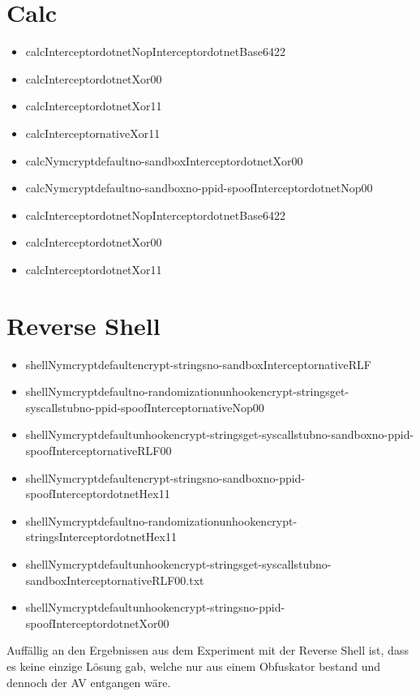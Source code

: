 \section{Calc}
\begin{itemize}
\item calcInterceptordotnetNopInterceptordotnetBase6422
\item calcInterceptordotnetXor00
\item calcInterceptordotnetXor11
\item calcInterceptornativeXor11
\item calcNymcryptdefaultno-sandboxInterceptordotnetXor00
\item calcNymcryptdefaultno-sandboxno-ppid-spoofInterceptordotnetNop00
\item calcInterceptordotnetNopInterceptordotnetBase6422
\item calcInterceptordotnetXor00
\item calcInterceptordotnetXor11
\end{itemize}
    
\section{Reverse Shell}
\begin{itemize}
\item shellNymcryptdefaultencrypt-stringsno-sandboxInterceptornativeRLF
\item shellNymcryptdefaultno-randomization\-unhookencrypt-stringsget-syscallstubno-ppid-spoof\-InterceptornativeNop00
\item shellNymcryptdefault\-unhookencrypt-stringsget-syscallstubno-sandboxno-ppid-spoof\-InterceptornativeRLF00
\item shellNymcryptdefault\-encrypt-stringsno-sandboxno-ppid-spoof\-InterceptordotnetHex11
\item shellNymcryptdefaultno-randomization\-unhooken\-crypt-stringsInterceptordotnetHex11
\item shellNymcryptdefault\-unhook\-encrypt-stringsget\--syscallstubno-sandbox\-InterceptornativeRLF00.txt
\item shellNymcryptdefaultunhookencrypt-stringsno-ppid-spoof\-InterceptordotnetXor00
\end{itemize}
Auffällig an den Ergebnissen aus dem Experiment mit der Reverse Shell ist, dass es keine einzige Lösung gab, welche nur aus einem Obfuskator bestand und dennoch der AV entgangen wäre.